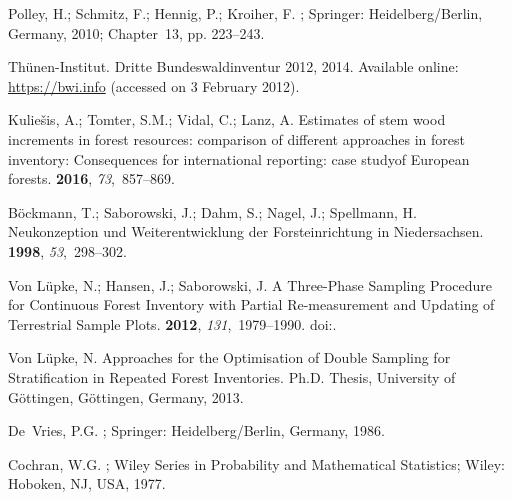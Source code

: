 \documentclass[remotesensing,article,accept,moreauthors,pdftex,10pt,a4paper]{Definitions/mdpi}
\begin{document}
\begin{thebibliography}{999}
\providecommand{\natexlab}[1]{#1}

Polley, H.; Schmitz, F.; Hennig, P.; Kroiher, F.
; Springer: Heidelberg/Berlin, Germany, 2010; Chapter~13, pp. 223--243.

Th{\"u}nen-Institut.
\newblock Dritte {B}undeswaldinventur 2012,  2014. Available online: \url{https://bwi.info} (accessed on 3 February 2012).
 

Kulie{\v{s}}is, A.; Tomter, S.M.; Vidal, C.; Lanz, A.
\newblock Estimates of stem wood increments in forest resources: comparison of
  different approaches in forest inventory: Consequences for international
  reporting: case studyof European forests.
 {\bf 2016}, {\em 73},~857--869.

B{\"o}ckmann, T.; Saborowski, J.; Dahm, S.; Nagel, J.; Spellmann, H.
\newblock Neukonzeption und Weiterentwicklung der Forsteinrichtung in
  Niedersachsen.
 {\bf 1998}, {\em 53},~298--302.

Von L{\"u}pke, N.; Hansen, J.; Saborowski, J.
\newblock A Three-Phase Sampling Procedure for Continuous Forest Inventory with
  Partial Re-measurement and Updating of Terrestrial Sample Plots.
 {\bf 2012}, {\em
  131},~1979--1990.
\newblock
doi:{\href{https://doi.org/10.1007/s10342-012-0648-z}{}}.

Von L{\"u}pke, N.
\newblock Approaches for the Optimisation of Double Sampling for Stratification
  in Repeated Forest Inventories.
\newblock Ph.D. Thesis, University of G{\"o}ttingen, Göttingen, Germany, 2013.

De~Vries, P.G.
;
  Springer: Heidelberg/Berlin, Germany, 1986.

Cochran, W.G.
; Wiley Series in Probability and
  Mathematical Statistics; Wiley:  Hoboken, NJ, USA,
  1977.


\end{thebibliography}
\end{document}
